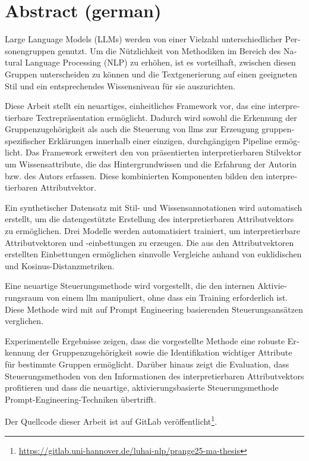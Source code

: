 

\vspace*{20mm}

\chapter*{Abstract (german)}%
\label{sec:abstract-german}
\vspace*{-10mm}

\begin{otherlanguage}{ngerman}
  \addtolength{\parskip}{-6pt}
  Large Language Models (LLMs) werden von einer Vielzahl unterschiedlicher Personengruppen genutzt. Um die Nützlichkeit von Methodiken im Bereich des Natural Language Processing (NLP) zu erhöhen, ist es vorteilhaft, zwischen diesen Gruppen unterscheiden zu können und die Textgenerierung auf einen geeigneten Stil und ein entsprechendes Wissensniveau für sie auszurichten.

  Diese Arbeit stellt ein neuartiges, einheitliches Framework vor, das eine interpretierbare Textrepräsentation ermöglicht. Dadurch wird sowohl die Erkennung der Gruppenzugehörigkeit als auch die Steuerung von \acp{llm} zur Erzeugung gruppenspezifischer Erklärungen innerhalb einer einzigen, durchgängigen Pipeline ermöglicht. Das Framework erweitert den von \citet{patelLearningInterpretableStyle2023} präsentierten interpretierbaren Stilvektor um Wissensattribute, die das Hintergrundwissen und die Erfahrung der Autorin bzw. des Autors erfassen. Diese kombinierten Komponenten bilden den interpretierbaren Attributvektor.

  Ein synthetischer Datensatz mit Stil- und Wissensannotationen wird automatisch erstellt, um die datengestützte Erstellung des interpretierbaren Attributvektors zu ermöglichen. Drei Modelle werden automatisiert trainiert, um interpretierbare Attributvektoren und -einbettungen zu erzeugen. Die aus den Attributvektoren erstellten Einbettungen ermöglichen sinnvolle Vergleiche anhand von euklidischen und Kosinus-Distanzmetriken.

  Eine neuartige Steuerungsmethode wird vorgestellt, die den internen Aktivierungsraum von einem \ac{llm} manipuliert, ohne dass ein Training erforderlich ist. Diese Methode wird mit auf Prompt Engineering basierenden Steuerungsansätzen verglichen.

  Experimentelle Ergebnisse zeigen, dass die vorgestellte Methode eine robuste Erkennung der Gruppenzugehörigkeit sowie die Identifikation wichtiger Attribute für bestimmte Gruppen ermöglicht. Darüber hinaus zeigt die Evaluation, dass Steuerungsmethoden von den Informationen des interpretierbaren Attributvektors profitieren und dass die neuartige, aktivierungsbasierte Steuerungsmethode Prompt-Engineering-Techniken übertrifft.

  Der Quellcode dieser Arbeit ist auf GitLab veröffentlicht\footnote{\url{https://gitlab.uni-hannover.de/luhai-nlp/prange25-ma-thesis}}.
\end{otherlanguage}
